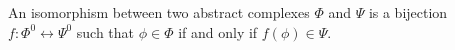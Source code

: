 An isomorphism between two abstract complexes $\Phi$ and $\Psi$ is a bijection $f: \Phi^0 \leftrightarrow \Psi^0$ such that $\phi \in \Phi$ if and only if $f(\phi) \in \Psi$.
